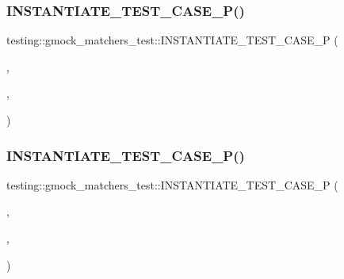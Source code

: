 \subsubsection{\texorpdfstring{INSTANTIATE\_TEST\_CASE\_P()}{INSTANTIATE\_TEST\_CASE\_P()}\hspace{0.1cm}{\footnotesize\ttfamily [1/3]}}
{\footnotesize\ttfamily testing\+::gmock\+\_\+matchers\+\_\+test\+::\+I\+N\+S\+T\+A\+N\+T\+I\+A\+T\+E\+\_\+\+T\+E\+S\+T\+\_\+\+C\+A\+S\+E\+\_\+P (\begin{DoxyParamCaption}\item[{All\+Graphs}]{,  }\item[{Bipartite\+Test}]{,  }\item[{\+::\mbox{\hyperlink{namespacetesting_a4f2c9978ad0c764f57e0cbd6f72cb540}{testing\+::\+Range}}(0, 5)}]{ }\end{DoxyParamCaption})}

\mbox{\label{namespacetesting_1_1gmock__matchers__test_a64ef722e930c3088ddea704ac20194b5}} 
\subsubsection{\texorpdfstring{INSTANTIATE\_TEST\_CASE\_P()}{INSTANTIATE\_TEST\_CASE\_P()}\hspace{0.1cm}{\footnotesize\ttfamily [2/3]}}
{\footnotesize\ttfamily testing\+::gmock\+\_\+matchers\+\_\+test\+::\+I\+N\+S\+T\+A\+N\+T\+I\+A\+T\+E\+\_\+\+T\+E\+S\+T\+\_\+\+C\+A\+S\+E\+\_\+P (\begin{DoxyParamCaption}\item[{All\+Graphs}]{,  }\item[{Bipartite\+Non\+Square\+Test}]{,  }\item[{\mbox{\hyperlink{namespacetesting_abd3c87b40c2a0663691c9b617ed5fcc2}{testing\+::\+Values}}(std\+::make\+\_\+pair(1, 2), std\+::make\+\_\+pair(2, 1), std\+::make\+\_\+pair(3, 2), std\+::make\+\_\+pair(2, 3), std\+::make\+\_\+pair(4, 1), std\+::make\+\_\+pair(1, 4), std\+::make\+\_\+pair(4, 3), std\+::make\+\_\+pair(3, 4))}]{ }\end{DoxyParamCaption})}

\mbox{\label{namespacetesting_1_1gmock__matchers__test_a857f48ffb1fc6f5ce61aec79b5c94da8}} 

